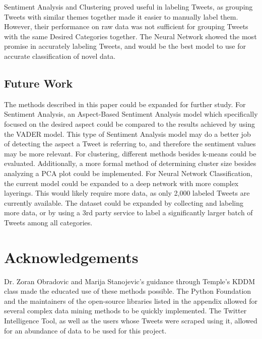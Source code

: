 \documentclass[12pt,letterpaper,oneside,titlepage]{article}
\begin{document}
Sentiment Analysis and Clustering proved useful in labeling Tweets, as grouping Tweets with similar themes together 
made it easier to manually label them. However, their performance on raw data was not sufficient for grouping 
Tweets with the same Desired Categories together. The Neural Network showed the most promise in accurately 
labeling Tweets, and would be the best model to use for accurate classification of novel data.

\subsection{Future Work}\label{subsec:future-work}

The methods described in this paper could be expanded for further study. For Sentiment Analysis, an Aspect-Based 
Sentiment Analysis model which specifically focused on the desired aspect could be compared to the results achieved 
by using the VADER model\cite{aspect}. This type of Sentiment Analysis model may do a better job of detecting 
the aspect a Tweet is referring to, and therefore the sentiment values may be more relevant. 
For clustering, different methods besides k-means could be evaluated. Additionally, a more formal method of 
determining cluster size besides analyzing a PCA plot could be implemented. 
For Neural Network Classification, the current model could be expanded to a deep network with more 
complex layerings. This would likely require more data, as only 2,000 labeled Tweets 
are currently available. The dataset could be expanded by collecting and labeling more data, or by using a 3rd party 
service to label a significantly larger batch of Tweets among all categories.

\section{Acknowledgements}\label{sec:acknowledgements}

Dr. Zoran Obradovic and Marija Stanojevic's guidance through Temple's KDDM class made the educated use of these methods possible. 
The Python Foundation and the maintainers of the open-source libraries listed in the appendix allowed for several 
complex data mining methods to be quickly implemented. 
The Twitter Intelligence Tool, as well as the users whose Tweets were scraped using it, allowed for an abundance of data to be used for this project.

\pagebreak

\printbibliography
\end{document}

